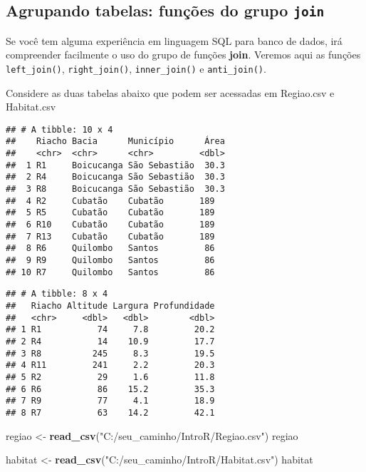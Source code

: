\documentclass[
]{book}
\newenvironment{Shaded}{\begin{snugshade}}{\end{snugshade}}
\newcommand{\KeywordTok}[1]{\textcolor[rgb]{0.13,0.29,0.53}{\textbf{#1}}}
\newcommand{\NormalTok}[1]{#1}
\newcommand{\StringTok}[1]{\textcolor[rgb]{0.31,0.60,0.02}{#1}}
\begin{document}
\hypertarget{agrupando-tabelas-funuxe7uxf5es-do-grupo-join}{%
\subsection{\texorpdfstring{Agrupando tabelas: funções do grupo \texttt{join}}{Agrupando tabelas: funções do grupo join}}\label{agrupando-tabelas-funuxe7uxf5es-do-grupo-join}}

Se você tem alguma experiência em linguagem SQL para banco de dados, irá compreender facilmente o uso do grupo de funções \textbf{join}. Veremos aqui as funções \texttt{left\_join()}, \texttt{right\_join()}, \texttt{inner\_join()} e \texttt{anti\_join()}.

Considere as duas tabelas abaixo que podem ser acessadas em Regiao.csv e Habitat.csv

\begin{verbatim}
## # A tibble: 10 x 4
##    Riacho Bacia      Município      Área
##    <chr>  <chr>      <chr>         <dbl>
##  1 R1     Boicucanga São Sebastião  30.3
##  2 R4     Boicucanga São Sebastião  30.3
##  3 R8     Boicucanga São Sebastião  30.3
##  4 R2     Cubatão    Cubatão       189  
##  5 R5     Cubatão    Cubatão       189  
##  6 R10    Cubatão    Cubatão       189  
##  7 R13    Cubatão    Cubatão       189  
##  8 R6     Quilombo   Santos         86  
##  9 R9     Quilombo   Santos         86  
## 10 R7     Quilombo   Santos         86
\end{verbatim}

\begin{verbatim}
## # A tibble: 8 x 4
##   Riacho Altitude Largura Profundidade
##   <chr>     <dbl>   <dbl>        <dbl>
## 1 R1           74     7.8         20.2
## 2 R4           14    10.9         17.7
## 3 R8          245     8.3         19.5
## 4 R11         241     2.2         20.3
## 5 R2           29     1.6         11.8
## 6 R6           86    15.2         35.3
## 7 R9           77     4.1         18.9
## 8 R7           63    14.2         42.1
\end{verbatim}

\begin{Shaded}
\begin{Highlighting}[]
\NormalTok{regiao <-}\StringTok{ }\KeywordTok{read_csv}\NormalTok{(}\StringTok{"C:/seu_caminho/IntroR/Regiao.csv"}\NormalTok{)}
\NormalTok{regiao}
\end{Highlighting}
\end{Shaded}

\begin{Shaded}
\begin{Highlighting}[]
\NormalTok{habitat <-}\StringTok{ }\KeywordTok{read_csv}\NormalTok{(}\StringTok{"C:/seu_caminho/IntroR/Habitat.csv"}\NormalTok{)}
\NormalTok{habitat}
\end{Highlighting}
\end{Shaded}
\end{document}
